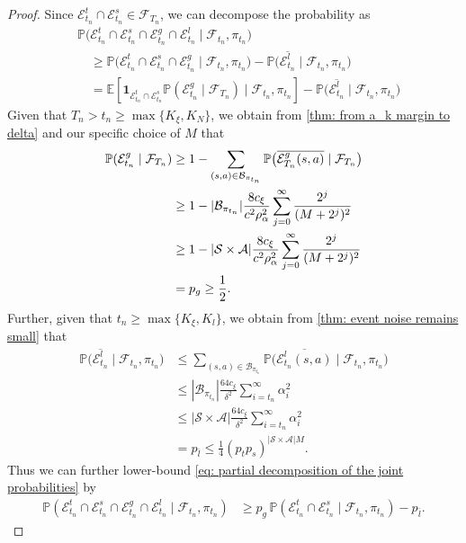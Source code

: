 \begin{proof}
Since $\mathcal E^t_{t_n} \cap \mathcal E^s_{t_n} \in \mathcal F_{T_n}$, we can decompose the probability as
\begin{align}
\nonumber
&\mathbb P \bigl(\mathcal E^t_{t_n} \cap \mathcal E^s_{t_n} \cap \mathcal E^g_{t_n} \cap \mathcal E^l_{t_n} \mid \mathcal F_{t_n} , \pi_{t_n} \bigr)
\\
\nonumber
&\quad \ge
\mathbb P \bigl(\mathcal E^t_{t_n} \cap \mathcal E^s_{t_n} \cap \mathcal E^g_{t_n} \mid \mathcal F_{t_n} , \pi_{t_n} \bigr) 
- \mathbb  P\bigl(\overline{\mathcal E^l_{t_n}} \mid \mathcal F_{t_n} , \pi_{t_n} \bigr)
\\
\label{eq: partial decomposition of the joint probabilities}
&\quad = \mathbb E \left[ \mathbf 1_{\mathcal E^t_{t_n} \cap \mathcal E^s_{t_n}} \mathbb P(\mathcal E^g_{t_n} \mid \mathcal F_{T_n}) \mid \mathcal F_{t_n}, \pi_{t_n} \right] - \mathbb P\bigl(\overline{\mathcal E^l_{t_n}} \mid \mathcal F_{t_n} , \pi_{t_n} \bigr)
\end{align}
Given that $T_n > t_n \ge \max \{K_\xi, K_N\}$, we obtain from \autoref{thm: from a_k margin to delta} and our specific choice of $M$ that
\begin{align*}
\mathbb P(\mathcal E^g_{t_n} \mid \mathcal F_{T_n}) 
&\ge 1 - \sum_{(s,a) \in \mathcal B_{\pi_{t_n}}} \mathbb P \bigl( \overline{\mathcal E^g_{T_n}(s,a)} \mid \mathcal F_{T_n} \bigr)
\\
&\ge 1 - |\mathcal B_{\pi_{t_n}}| \frac{8 c_\xi}{c^2 \rho_\alpha^2} \sum_{j = 0}^{\infty} \frac{2^j}{(M+ 2^j)^2}
\\
&\ge 1 - |\mathcal{S} \times \mathcal{A}| \frac{8 c_\xi}{c^2 \rho_\alpha^2} \sum_{j = 0}^{\infty} \frac{2^j}{(M+ 2^j)^2}
\\
&= p_g \ge \frac12 .
\end{align*}
Further, given that $t_n \ge \max \{K_\xi, K_l\}$, we obtain from \autoref{thm: event noise remains small} that
\begin{align*}
\mathbb P \bigl( \overline{\mathcal E^l_{t_n}} \mid \mathcal F_{t_n} , \pi_{t_n} \bigr)
&\le
\sum_{(s,a) \in \mathcal B_{\pi_{t_n}}} \mathbb P \bigl(\overline{\mathcal E^l_{t_n}(s,a)} \mid \mathcal F_{t_n}, \pi_{t_n} \bigr)
\\
&\le
|\mathcal B_{\pi_{t_n}}|
\frac{64 c_\xi}{\delta^2}\sum_{i={t_n}}^\infty \alpha_i^2
\\
&\le
|\mathcal S\times\mathcal A|
\frac{64 c_\xi}{\delta^2}\sum_{i={t_n}}^\infty \alpha_i^2
\\
&=
p_{\overline l}
\le
\frac14 ( p_t p_s)^{|\mathcal S \times \mathcal A| M} .
\end{align*}
Thus we can further lower-bound \eqref{eq: partial decomposition of the joint probabilities} by
\begin{align}
\label{eq: probability lower bound intermediary}
\mathbb  P(\mathcal E^t_{t_n} \cap \mathcal E^s_{t_n} \cap \mathcal E^g_{t_n} \cap \mathcal E^l_{t_n} \mid \mathcal F_{t_n}, \pi_{t_n} )
&\ge
p_g \, \mathbb P(\mathcal E^t_{t_n} \cap \mathcal E^s_{t_n} \mid \mathcal F_{t_n}, \pi_{t_n}) - p_{\overline l} .
\end{align}



\end{proof}
